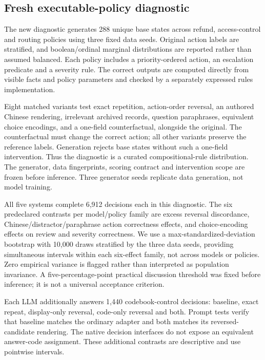 

\subsection{Fresh executable-policy diagnostic}
The new diagnostic generates 288 unique base states across refund, access-control and routing policies using three fixed data seeds. Original action labels are stratified, and boolean/ordinal marginal distributions are reported rather than assumed balanced. Each policy includes a priority-ordered action, an escalation predicate and a severity rule. The correct outputs are computed directly from visible facts and policy parameters and checked by a separately expressed rules implementation.

Eight matched variants test exact repetition, action-order reversal, an authored Chinese rendering, irrelevant archived records, question paraphrases, equivalent choice encodings, and a one-field counterfactual, alongside the original. The counterfactual must change the correct action; all other variants preserve the reference labels. Generation rejects base states without such a one-field intervention. Thus the diagnostic is a curated compositional-rule distribution. The generator, data fingerprints, scoring contract and intervention scope are frozen before inference. Three generator seeds replicate data generation, not model training.

All five systems complete 6,912 decisions each in this diagnostic. The six predeclared contrasts per model/policy family are excess reversal discordance, Chinese/distractor/paraphrase action correctness effects, and choice-encoding effects on review and severity correctness. We use a max-standardized-deviation bootstrap with 10,000 draws stratified by the three data seeds, providing simultaneous intervals within each six-effect family, not across models or policies. Zero empirical variance is flagged rather than interpreted as population invariance. A five-percentage-point practical discussion threshold was fixed before inference; it is not a universal acceptance criterion.

Each LLM additionally answers 1,440 codebook-control decisions: baseline, exact repeat, display-only reversal, code-only reversal and both. Prompt tests verify that baseline matches the ordinary adapter and both matches its reversed-candidate rendering. The native decision interfaces do not expose an equivalent answer-code assignment. These additional contrasts are descriptive and use pointwise intervals.

